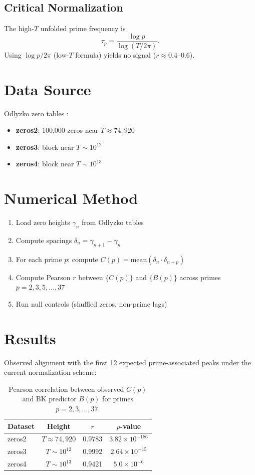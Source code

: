 \documentclass[11pt]{article}
\begin{document}
\subsection{Critical Normalization}
The high-$T$ unfolded prime frequency is
\[
\tau_p = \frac{\log p}{\log(T/2\pi)}.
\]
Using $\log p / 2\pi$ (low-$T$ formula) yields no signal
($r \approx 0.4$--$0.6$).

\section{Data Source}

Odlyzko zero tables \cite{odlyzko}:
\begin{itemize}
\item \textbf{zeros2}: 100,000 zeros near $T \approx 74{,}920$
\item \textbf{zeros3}: block near $T \sim 10^{12}$
\item \textbf{zeros4}: block near $T \sim 10^{13}$
\end{itemize}

\section{Numerical Method}

\begin{enumerate}
\item Load zero heights $\gamma_n$ from Odlyzko tables
\item Compute spacings $\delta_n = \gamma_{n+1} - \gamma_n$
\item For each prime $p$: compute $C(p) = \text{mean}(\delta_n \cdot \delta_{n+p})$
\item Compute Pearson $r$ between $\{C(p)\}$ and $\{B(p)\}$
  across primes $p = 2, 3, 5, \ldots, 37$
\item Run null controls (shuffled zeros, non-prime lags)
\end{enumerate}

\section{Results}

Observed alignment with the first 12 expected prime-associated
peaks under the current normalization scheme:

\begin{table}[h]
\centering
\begin{tabular}{lccc}
\toprule
Dataset & Height & $r$ & $p$-value \\
\midrule
zeros2 & $T \approx 74{,}920$ & 0.9783 & $3.82 \times 10^{-186}$ \\
zeros3 & $T \sim 10^{12}$ & 0.9992 & $2.64 \times 10^{-15}$ \\
zeros4 & $T \sim 10^{13}$ & 0.9421 & $5.0 \times 10^{-6}$ \\
\bottomrule
\end{tabular}
\caption{Pearson correlation between observed $C(p)$ and
BK predictor $B(p)$ for primes $p = 2, 3, \ldots, 37$.}
\end{table}
\end{document}

